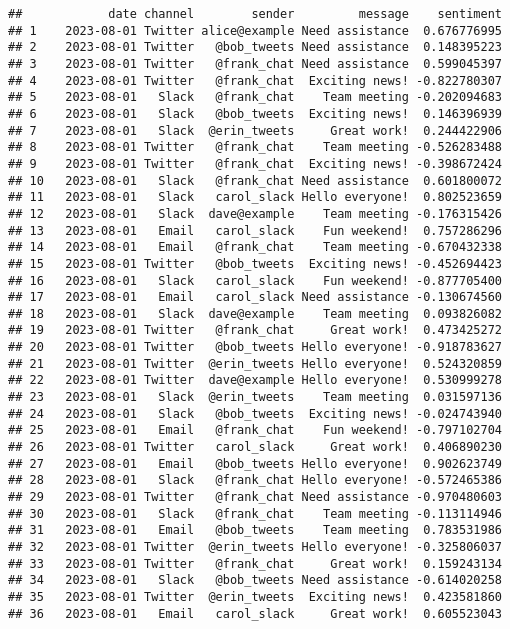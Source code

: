 \documentclass[
]{article}
\begin{document}
\begin{verbatim}
##            date channel        sender         message    sentiment
## 1    2023-08-01 Twitter alice@example Need assistance  0.676776995
## 2    2023-08-01 Twitter   @bob_tweets Need assistance  0.148395223
## 3    2023-08-01 Twitter   @frank_chat Need assistance  0.599045397
## 4    2023-08-01 Twitter   @frank_chat  Exciting news! -0.822780307
## 5    2023-08-01   Slack   @frank_chat    Team meeting -0.202094683
## 6    2023-08-01   Slack   @bob_tweets  Exciting news!  0.146396939
## 7    2023-08-01   Slack  @erin_tweets     Great work!  0.244422906
## 8    2023-08-01 Twitter   @frank_chat    Team meeting -0.526283488
## 9    2023-08-01 Twitter   @frank_chat  Exciting news! -0.398672424
## 10   2023-08-01   Slack   @frank_chat Need assistance  0.601800072
## 11   2023-08-01   Slack   carol_slack Hello everyone!  0.802523659
## 12   2023-08-01   Slack  dave@example    Team meeting -0.176315426
## 13   2023-08-01   Email   carol_slack    Fun weekend!  0.757286296
## 14   2023-08-01   Email   @frank_chat    Team meeting -0.670432338
## 15   2023-08-01 Twitter   @bob_tweets  Exciting news! -0.452694423
## 16   2023-08-01   Slack   carol_slack    Fun weekend! -0.877705400
## 17   2023-08-01   Email   carol_slack Need assistance -0.130674560
## 18   2023-08-01   Slack  dave@example    Team meeting  0.093826082
## 19   2023-08-01 Twitter   @frank_chat     Great work!  0.473425272
## 20   2023-08-01 Twitter   @bob_tweets Hello everyone! -0.918783627
## 21   2023-08-01 Twitter  @erin_tweets Hello everyone!  0.524320859
## 22   2023-08-01 Twitter  dave@example Hello everyone!  0.530999278
## 23   2023-08-01   Slack  @erin_tweets    Team meeting  0.031597136
## 24   2023-08-01   Slack   @bob_tweets  Exciting news! -0.024743940
## 25   2023-08-01   Email   @frank_chat    Fun weekend! -0.797102704
## 26   2023-08-01 Twitter   carol_slack     Great work!  0.406890230
## 27   2023-08-01   Email   @bob_tweets Hello everyone!  0.902623749
## 28   2023-08-01   Slack   @frank_chat Hello everyone! -0.572465386
## 29   2023-08-01 Twitter   @frank_chat Need assistance -0.970480603
## 30   2023-08-01   Slack   @frank_chat    Team meeting -0.113114946
## 31   2023-08-01   Email   @bob_tweets    Team meeting  0.783531986
## 32   2023-08-01 Twitter  @erin_tweets Hello everyone! -0.325806037
## 33   2023-08-01 Twitter   @frank_chat     Great work!  0.159243134
## 34   2023-08-01   Slack   @bob_tweets Need assistance -0.614020258
## 35   2023-08-01 Twitter  @erin_tweets  Exciting news!  0.423581860
## 36   2023-08-01   Email   carol_slack     Great work!  0.605523043

\end{verbatim}
\end{document}
